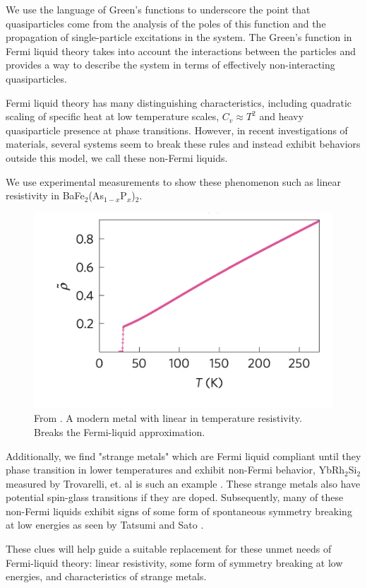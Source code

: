 \documentclass[reprint]{revtex4-2}
\begin{document}
We use the language of Green's functions to underscore the point that quasiparticles come from the analysis of the poles of this function and the propagation of single-particle excitations in the system. The Green's function in Fermi liquid theory takes into account the interactions between the particles and provides a way to describe the system in terms of effectively non-interacting quasiparticles. 
\par Fermi liquid theory has many distinguishing characteristics, including quadratic scaling of specific heat at low temperature scales, $C_{v} \approx T^{2}$ and heavy quasiparticle presence at phase transitions. However, in recent investigations of materials, several systems seem to break these rules and instead exhibit behaviors outside this model, we call these non-Fermi liquids.
\par We use experimental measurements to show these phenomenon such as linear resistivity in BaFe$_{2}$(As$_{1-x}$P$_{x}$)$_{2}$\cite{Hayes_2016}.
\begin{figure}[H]
    \centering
    \includegraphics[scale = 0.4]{Linear.png}
    \caption{From \cite{Hayes_2016}. A modern metal with linear in temperature resistivity. Breaks the Fermi-liquid approximation.}
    \label{fig:enter-label}
\end{figure}

Additionally, we find "strange metals" which are Fermi liquid compliant until they phase transition in lower temperatures and exhibit non-Fermi behavior, YbRh$_{2}$Si$_{2}$ measured by Trovarelli, et. al is such an example \cite{PhysRevLett.85.626}. These strange metals also have potential spin-glass transitions if they are doped. Subsequently, many of these non-Fermi liquids exhibit signs of some form of spontaneous symmetry breaking at low energies as seen by Tatsumi and Sato \cite{Tatsumi_2009}.
\par These clues will help guide a suitable replacement for these unmet needs of Fermi-liquid theory: linear resistivity, some form of symmetry breaking at low energies, and characteristics of strange metals. 
\end{document}
